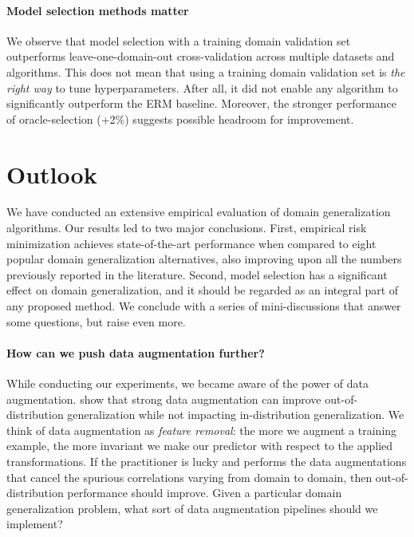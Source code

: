 \documentclass{article}
\begin{document}
\paragraph{Model selection methods matter}
We observe that model selection with a training domain validation set outperforms leave-one-domain-out cross-validation across multiple datasets and algorithms.
This does not mean that using a training domain validation set is \emph{the right way} to tune hyperparameters.
After all, it did not enable any algorithm to significantly outperform the ERM baseline.
Moreover, the stronger performance of oracle-selection (+2\%) suggests possible headroom for improvement. 

\section{Outlook}
\label{sec:outlook}

We have conducted an extensive empirical evaluation of domain generalization algorithms.
Our results led to two major conclusions.
First, empirical risk minimization achieves state-of-the-art performance when compared to eight popular domain generalization alternatives, also improving upon all the numbers previously reported in the literature.
Second, model selection has a significant effect on domain generalization, and it should be regarded as an integral part of any proposed method.
We conclude with a series of mini-discussions that answer some questions, but raise even more.

\paragraph{How can we push data augmentation further?}
While conducting our experiments, we became aware of the power of data augmentation.
\citet{zhang2019unseen} show that strong data augmentation can improve out-of-distribution generalization while not impacting in-distribution generalization.
We think of data augmentation as \emph{feature removal}: the more we augment a training example, the more invariant we make our predictor with respect to the applied transformations.
If the practitioner is lucky and performs the data augmentations that cancel the spurious correlations varying from domain to domain, then out-of-distribution performance should improve.
Given a particular domain generalization problem, what sort of data augmentation pipelines should we implement?
\end{document}
